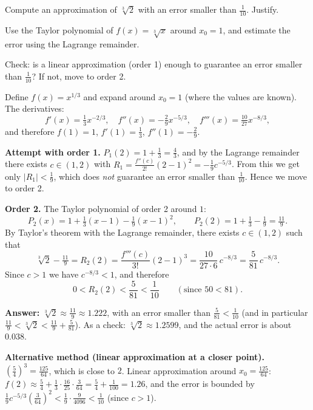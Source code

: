 
\begin{question}
Compute an approximation of $\sqrt[3]{2}$ with an error smaller than $\frac{1}{10}$. Justify.
\end{question}

\begin{hint}
Use the Taylor polynomial of $f(x) = \sqrt[3]{x}$ around $x_0 = 1$, and estimate the error using the Lagrange remainder.
\end{hint}

\begin{hint}
Check: is a linear approximation (order 1) enough to guarantee an error smaller than $\frac1{10}$? If not, move to order 2.
\end{hint}

\begin{solution}
Define $f(x) = x^{1/3}$ and expand around $x_0 = 1$ (where the values are known). The derivatives:
\[ f'(x) = \tfrac13 x^{-2/3},\quad f''(x) = -\tfrac29 x^{-5/3},\quad f'''(x) = \tfrac{10}{27}x^{-8/3}, \]
and therefore $f(1) = 1$, $f'(1) = \frac13$, $f''(1) = -\frac29$.

\textbf{Attempt with order 1.} $P_1(2) = 1 + \frac13 = \frac43$, and by the Lagrange remainder there exists $c\in(1,2)$ with
$R_1 = \frac{f''(c)}{2!}(2-1)^2 = -\frac19 c^{-5/3}$. From this we get only $|R_1| < \frac19$, which does \emph{not} guarantee an error smaller than $\frac1{10}$. Hence we move to order 2.

\textbf{Order 2.} The Taylor polynomial of order 2 around $1$:
\[ P_2(x) = 1 + \tfrac13(x-1) - \tfrac19(x-1)^2, \qquad P_2(2) = 1 + \tfrac13 - \tfrac19 = \tfrac{11}{9}. \]
By Taylor's theorem with the Lagrange remainder, there exists $c \in (1,2)$ such that
\[ \sqrt[3]{2} - \tfrac{11}{9} = R_2(2) = \frac{f'''(c)}{3!}(2-1)^3 = \frac{10}{27\cdot 6}\,c^{-8/3} = \frac{5}{81}\,c^{-8/3}. \]
Since $c > 1$ we have $c^{-8/3} < 1$, and therefore
\[ 0 < R_2(2) < \frac{5}{81} < \frac{1}{10} \qquad (\text{since } 50 < 81). \]

\textbf{Answer:} $\sqrt[3]{2} \approx \frac{11}{9} \approx 1.222$, with an error smaller than $\frac{5}{81}<\frac1{10}$ (and in particular $\frac{11}{9} < \sqrt[3]{2} < \frac{11}{9} + \frac{5}{81}$).
As a check: $\sqrt[3]{2} \approx 1.2599$, and the actual error is about $0.038$.

\textbf{Alternative method (linear approximation at a closer point).} $\left(\frac54\right)^3 = \frac{125}{64}$, which is close to $2$. Linear approximation around $x_0 = \frac{125}{64}$:
$f(2) \approx \frac54 + \frac13\cdot\frac{16}{25}\cdot\frac{3}{64} = \frac54 + \frac1{100} = 1.26$, and the error is bounded by $\frac19 c^{-5/3}\left(\frac3{64}\right)^2 < \frac{1}{9}\cdot\frac{9}{4096}<\frac1{10}$ (since $c>1$).
\end{solution}
